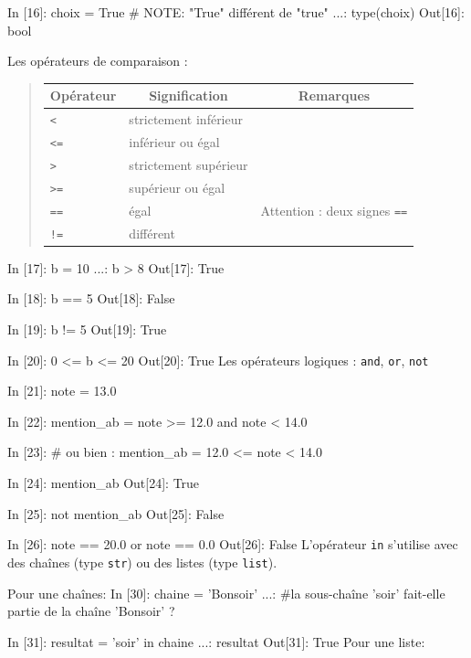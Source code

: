 \documentclass[%
oneside,                 %
final,                   %
10pt]{article}
\begin{document}
\bipy
In [16]: choix = True # NOTE: "True" différent de "true"
    ...: type(choix)
Out[16]: bool
\eipy

Les opérateurs de comparaison :




\begin{quote}
\begin{tabular}{lll}
\hline
\multicolumn{1}{c}{ Opérateur } & \multicolumn{1}{c}{ Signification } & \multicolumn{1}{c}{ Remarques } \\
\hline
\texttt{<}  & strictement inférieur &                                   \\
\texttt{<=} & inférieur ou égal     &                                   \\
\texttt{>}  & strictement supérieur &                                   \\
\texttt{>=} & supérieur ou égal     &                                   \\
\texttt{==} & égal                  & Attention : deux signes \texttt{==} \\
\Verb?!=? & différent             &                                   \\
\hline
\end{tabular}
\end{quote}

\noindent
\bipy
In [17]: b = 10
    ...: b > 8
Out[17]: True

In [18]: b == 5
Out[18]: False

In [19]: b != 5
Out[19]: True

In [20]: 0 <= b <= 20
Out[20]: True
\eipy
Les opérateurs logiques : \texttt{and}, \texttt{or}, \texttt{not}

\bipy
In [21]: note = 13.0

In [22]: mention_ab = note >= 12.0 and note < 14.0

In [23]: # ou bien : mention_ab = 12.0 <= note < 14.0

In [24]: mention_ab
Out[24]: True
\eipy

\bipy
In [25]: not mention_ab
Out[25]: False

In [26]: note == 20.0 or note == 0.0
Out[26]: False
\eipy
L'opérateur \texttt{in} s'utilise avec des chaînes (type \texttt{str}) ou des listes (type \texttt{list}).

Pour une chaînes:
\bipy
In [30]: chaine = 'Bonsoir'
    ...: #la sous-chaîne 'soir' fait-elle partie de la chaîne 'Bonsoir' ?

In [31]: resultat = 'soir' in chaine
    ...: resultat
Out[31]: True
\eipy
Pour une liste:
\end{document}
